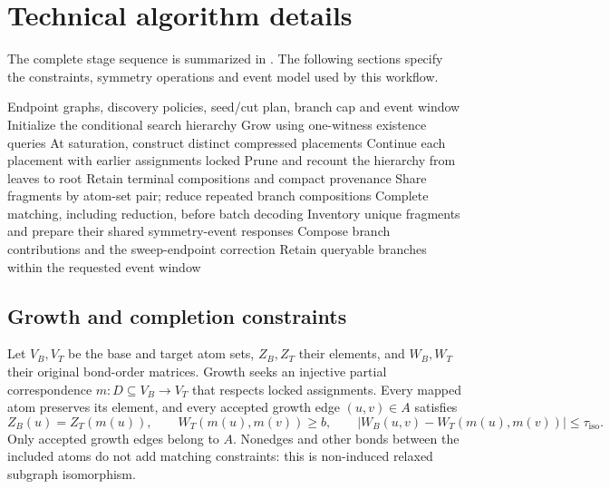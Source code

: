 \section{Technical algorithm details}
\label{sec:algorithm-details}
\setcounter{table}{0}
\renewcommand{\thetable}{A\arabic{table}}
\setcounter{figure}{0}
\renewcommand{\thefigure}{A\arabic{figure}}
\setcounter{algorithm}{0}
\renewcommand{\thealgorithm}{A\arabic{algorithm}}
\renewcommand{\theHalgorithm}{A.\arabic{algorithm}}

The complete stage sequence is summarized in . The following sections specify the constraints, symmetry operations and event model used by this workflow.

\begin{algorithm}[!htbp]
\caption{Matching (including reduction), followed by decoding}
\label{alg:mappa-overview}
\small
\begin{algorithmic}[1]
\REQUIRE Endpoint graphs, discovery policies, seed/cut plan, branch cap and event window
    \STATE Initialize the conditional search hierarchy
      \STATE Grow using one-witness existence queries
      \STATE At saturation, construct distinct compressed placements
      \STATE Continue each placement with earlier assignments locked
      \STATE Prune and recount the hierarchy from leaves to root
    \ENDWHILE
    \STATE Retain terminal compositions and compact provenance
  \ENDFOR
  \STATE Share fragments by atom-set pair; reduce repeated branch compositions
\ENDFOR
\STATE Complete matching, including reduction, before batch decoding
  \STATE Inventory unique fragments and prepare their shared symmetry-event responses
  \STATE Compose branch contributions and the sweep-endpoint correction
  \STATE Retain queryable branches within the requested event window
\ENDFOR
\end{algorithmic}
\end{algorithm}

\subsection{Growth and completion constraints}
\label{sec:existence-details}

Let $V_B,V_T$ be the base and target atom sets, $Z_B,Z_T$ their elements, and $W_B,W_T$ their original bond-order matrices. Growth seeks an injective partial correspondence $m:D\subseteq V_B\rightarrow V_T$ that respects locked assignments. Every mapped atom preserves its element, and every accepted growth edge $(u,v)\in A$ satisfies
\begin{equation}
 Z_B(u)=Z_T(m(u)),\qquad W_T(m(u),m(v))\geq b,\qquad
 |W_B(u,v)-W_T(m(u),m(v))|\leq\tau_{\mathrm{iso}}.
 \label{eq:match}
\end{equation}
Only accepted growth edges belong to $A$. Nonedges and other bonds between the included atoms do not add matching constraints: this is non-induced relaxed subgraph isomorphism.

